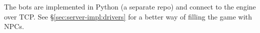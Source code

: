 The bots are implemented in Python (a separate repo) and connect to the
engine over TCP\@.
See \S\ref{sec:server-impl:drivers} for a better way of filling the game
with NPCs.
